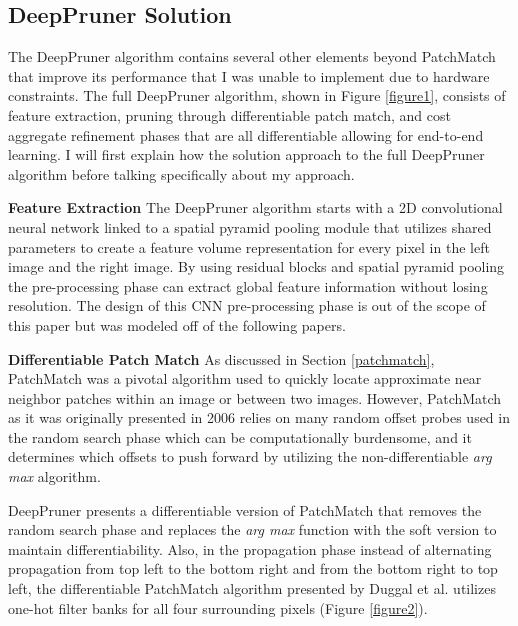 \documentclass{article}
\begin{document}
\subsection{DeepPruner Solution}
\label{deepprunersolution}
The DeepPruner \citep{duggal2019deeppruner} algorithm contains several other elements beyond PatchMatch \citep{barnes2009patchmatch} that improve its performance that I was unable to implement due to hardware constraints. The full DeepPruner algorithm, shown in Figure \ref{figure1}, consists of feature extraction, pruning through differentiable patch match, and cost aggregate refinement phases that are all differentiable allowing for end-to-end learning. I will first explain how the solution approach to the full DeepPruner algorithm before talking specifically about my approach.

\textbf{Feature Extraction} The DeepPruner algorithm \citep{duggal2019deeppruner} starts with a 2D convolutional neural network linked to a spatial pyramid pooling module that utilizes shared parameters to create a feature volume representation for every pixel in the left image and the right image. By using residual blocks and spatial pyramid pooling the pre-processing phase can extract global feature information without losing resolution. The design of this CNN pre-processing phase is out of the scope of this paper but was modeled off of the following papers.

\textbf{Differentiable Patch Match} As discussed in Section \ref{patchmatch}, PatchMatch \citep{barnes2009patchmatch} was a pivotal algorithm used to quickly locate approximate near neighbor patches within an image or between two images. However, PatchMatch as it was originally presented in 2006 relies on many random offset probes used in the random search phase which can be computationally burdensome, and it determines which offsets to push forward by utilizing the non-differentiable \textit{arg max} algorithm.

DeepPruner \citep{duggal2019deeppruner} presents a differentiable version of PatchMatch \citep{barnes2009patchmatch} that removes the random search phase and replaces the \textit{arg max} function with the soft version to maintain differentiability. Also, in the propagation phase instead of alternating propagation from top left to the bottom right and from the bottom right to top left, the differentiable PatchMatch algorithm presented by Duggal et al. \citep{duggal2019deeppruner} utilizes one-hot filter banks for all four surrounding pixels (Figure \ref{figure2}).
\end{document}
